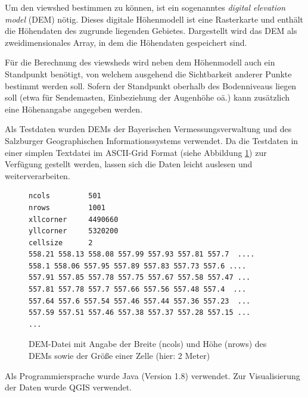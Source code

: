 Um den viewshed bestimmen zu können, ist ein sogenanntes \textit{digital elevation model} (DEM) nötig. 
Dieses digitale Höhenmodell ist eine Rasterkarte und enthält die Höhendaten des zugrunde liegenden Gebietes. 
Dargestellt wird das DEM als zweidimensionales Array, in dem die Höhendaten gespeichert sind. 

\noindent Für die Berechnung des viewsheds wird neben dem Höhenmodell auch ein Standpunkt benötigt, von welchem ausgehend die Sichtbarkeit anderer Punkte bestimmt werden soll. 
Sofern der Standpunkt oberhalb des Bodenniveaus liegen soll (etwa für Sendemasten, Einbeziehung der Augenhöhe oä.) kann zusätzlich eine Höhenangabe angegeben werden. 



\noindent Als Testdaten wurden DEMs der Bayerischen Vermessungsverwaltung \cite{berchtesgaden} und des Salzburger Geographischen Informationssystems 
\cite{salzburg} verwendet. Da die Testdaten in einer simplen Textdatei im ASCII-Grid Format (siehe Abbildung \ref{testfile}) zur Verfügung gestellt werden, lassen sich die Daten leicht auslesen und weiterverarbeiten.

\begin{figure}[!ht]
 \centering
 \begin{BVerbatim}
ncols         501
nrows         1001
xllcorner     4490660
yllcorner     5320200
cellsize      2
558.21 558.13 558.08 557.99 557.93 557.81 557.7  ....
558.1 558.06 557.95 557.89 557.83 557.73 557.6 ....
557.91 557.85 557.78 557.75 557.67 557.58 557.47 ...
557.81 557.78 557.7 557.66 557.56 557.48 557.4  ...
557.64 557.6 557.54 557.46 557.44 557.36 557.23  ...
557.59 557.51 557.46 557.38 557.37 557.28 557.15 ...
...
\end{BVerbatim}
\caption{DEM-Datei mit Angabe der Breite (ncols) und Höhe (nrows) des DEMs sowie der Größe einer Zelle (hier: 2 Meter)}
\label{testfile}
\end{figure}

\noindent Als Programmiersprache wurde Java (Version 1.8) verwendet. Zur Visualisierung der Daten wurde QGIS verwendet. 

